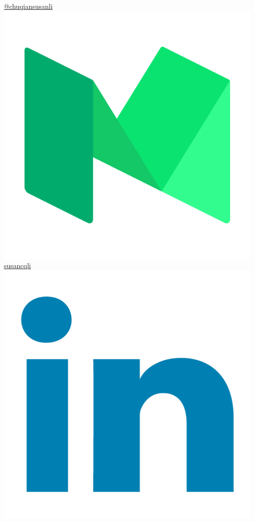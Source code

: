 \documentclass[]{friggeri-cv}
\begin{document}
\begin{aside}
  \href{https://medium.com/@chuqiansusanli}{@chuqiansusanli \includegraphics[scale=0.02]{mediumicon.png}}
  \href{https://www.linkedin.com/in/susancqli}{susancqli \includegraphics[scale=0.04]{linkedin-png-hd.png}}

\end{aside}
\end{document}
